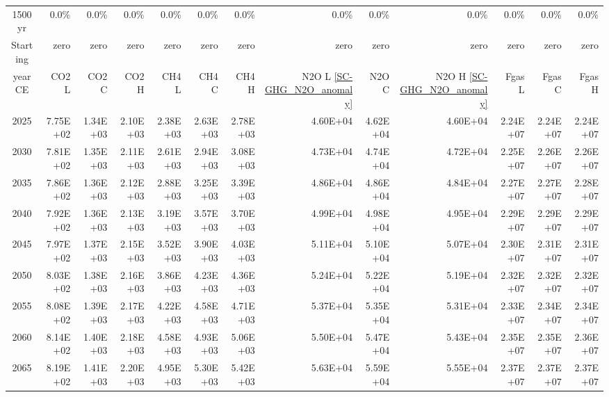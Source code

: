 \documentclass{article}
\begin{document}
\begin{table}
\begin{tabular}{crrr|rrr|rrr|rrr}
         &            &            &            &            &            &            &            &            &            &            &            &            \\ \hline
1500 yr  & 0.0\%      & 0.0\%      & 0.0\%      & 0.0\%      & 0.0\%      & 0.0\%      & 0.0\%      & 0.0\%      & 0.0\%      & 0.0\%      & 0.0\%      & 0.0\%      \\
Starting & zero       & zero       & zero       & zero       & zero       & zero       & zero       & zero       & zero       & zero       & zero       & zero       \\
year CE  & CO2 L      & CO2 C      & CO2 H      & CH4 L      & CH4 C      & CH4 H      & N2O L \ref{SC-GHG_N2O_anomaly}     & N2O C      & N2O H \ref{SC-GHG_N2O_anomaly}      & Fgas L     & Fgas C     & Fgas H     \\
2025     & 7.75E+02   & 1.34E+03   & 2.10E+03   & 2.38E+03   & 2.63E+03   & 2.78E+03   & 4.60E+04   & 4.62E+04   & 4.60E+04   & 2.24E+07   & 2.24E+07   & 2.24E+07   \\
2030     & 7.81E+02   & 1.35E+03   & 2.11E+03   & 2.61E+03   & 2.94E+03   & 3.08E+03   & 4.73E+04   & 4.74E+04   & 4.72E+04   & 2.25E+07   & 2.26E+07   & 2.26E+07   \\
2035     & 7.86E+02   & 1.36E+03   & 2.12E+03   & 2.88E+03   & 3.25E+03   & 3.39E+03   & 4.86E+04   & 4.86E+04   & 4.84E+04   & 2.27E+07   & 2.27E+07   & 2.28E+07   \\
2040     & 7.92E+02   & 1.36E+03   & 2.13E+03   & 3.19E+03   & 3.57E+03   & 3.70E+03   & 4.99E+04   & 4.98E+04   & 4.95E+04   & 2.29E+07   & 2.29E+07   & 2.29E+07   \\
2045     & 7.97E+02   & 1.37E+03   & 2.15E+03   & 3.52E+03   & 3.90E+03   & 4.03E+03   & 5.11E+04   & 5.10E+04   & 5.07E+04   & 2.30E+07   & 2.31E+07   & 2.31E+07   \\
2050     & 8.03E+02   & 1.38E+03   & 2.16E+03   & 3.86E+03   & 4.23E+03   & 4.36E+03   & 5.24E+04   & 5.22E+04   & 5.19E+04   & 2.32E+07   & 2.32E+07   & 2.32E+07   \\
2055     & 8.08E+02   & 1.39E+03   & 2.17E+03   & 4.22E+03   & 4.58E+03   & 4.71E+03   & 5.37E+04   & 5.35E+04   & 5.31E+04   & 2.33E+07   & 2.34E+07   & 2.34E+07   \\
2060     & 8.14E+02   & 1.40E+03   & 2.18E+03   & 4.58E+03   & 4.93E+03   & 5.06E+03   & 5.50E+04   & 5.47E+04   & 5.43E+04   & 2.35E+07   & 2.35E+07   & 2.36E+07   \\
2065     & 8.19E+02   & 1.41E+03   & 2.20E+03   & 4.95E+03   & 5.30E+03   & 5.42E+03   & 5.63E+04   & 5.59E+04   & 5.55E+04   & 2.37E+07   & 2.37E+07   & 2.37E+07   \\

\end{tabular}
\end{table}
\end{document}
